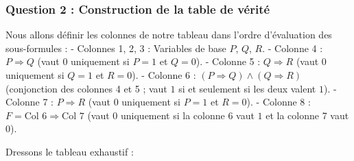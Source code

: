 \documentclass[11pt,a4paper]{article}
\begin{document}
\hypertarget{question-2-construction-de-la-table-de-vuxe9rituxe9}{%
\subsubsection{Question 2 : Construction de la table de
vérité}\label{question-2-construction-de-la-table-de-vuxe9rituxe9}}

Nous allons définir les colonnes de notre tableau dans l'ordre
d'évaluation des sous-formules : - Colonnes 1, 2, 3 : Variables de base
\(P\), \(Q\), \(R\). - Colonne 4 : \(P \Rightarrow Q\) (vaut \(0\)
uniquement si \(P=1\) et \(Q=0\)). - Colonne 5 : \(Q \Rightarrow R\)
(vaut \(0\) uniquement si \(Q=1\) et \(R=0\)). - Colonne 6 :
\((P \Rightarrow Q) \land (Q \Rightarrow R)\) (conjonction des colonnes
4 et 5 ; vaut \(1\) si et seulement si les deux valent \(1\)). - Colonne
7 : \(P \Rightarrow R\) (vaut \(0\) uniquement si \(P=1\) et \(R=0\)). -
Colonne 8 : \(F = \text{Col } 6 \Rightarrow \text{Col } 7\) (vaut \(0\)
uniquement si la colonne 6 vaut \(1\) et la colonne 7 vaut \(0\)).

Dressons le tableau exhaustif :
\end{document}
